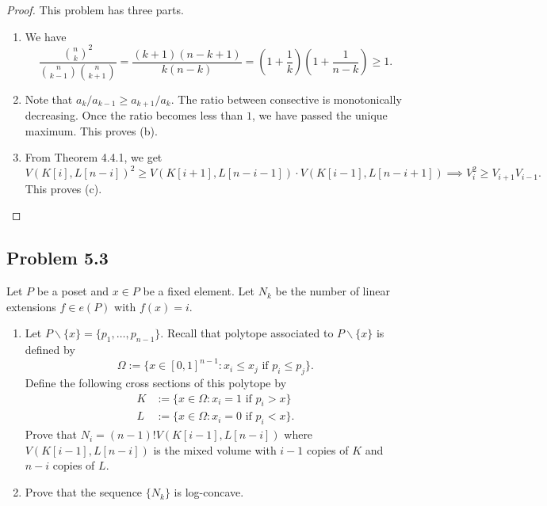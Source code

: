 \documentclass[12pt]{article}
\begin{document}
\begin{proof}
	This problem has three parts. 
	\begin{enumerate}[label = (\alph*)]
		\item We have 
		\[
			\frac{\binom{n}{k}^2}{\binom{n}{k-1} \binom{n}{k+1}} = \frac{(k+1)(n-k+1)}{k(n-k)} = \left ( 1 + \frac{1}{k} \right ) \left ( 1 + \frac{1}{n-k} \right ) \geq 1. 
		\]

		\item Note that $a_k / a_{k-1} \geq a_{k+1} / a_k$. The ratio between consective is monotonically decreasing. Once the ratio becomes less than $1$, we have passed the unique maximum. This proves (b). 

		\item From Theorem 4.4.1, we get 
		\[
			V(K[i], L[n-i])^2 \geq V(K[i+1], L[n-i-1]) \cdot V(K[i-1], L[n-i+1]) \implies V_i^2 \geq V_{i+1} V_{i-1}.
		\]
		This proves (c). 
	\end{enumerate}
\end{proof}

\newpage 

\subsection{Problem 5.3}

\begin{problem}
	Let $P$ be a poset and $x \in P$ be a fixed element. Let $N_k$ be the number of linear extensions $f \in e(P)$ with $f(x) = i$. 
    \begin{enumerate}[label = (\alph*)]
        \item Let $P \backslash \{x\} = \{p_1, \ldots, p_{n-1}\}$. Recall that polytope associated to $P \backslash \{x\}$ is defined by 
        \[
            \Omega := \{ x \in [0, 1]^{n-1} : x_i \leq x_j \text{ if } p_i \leq p_j \}.    
        \]
        Define the following cross sections of this polytope by 
        \begin{align*}
            K & := \{ x \in \Omega : x_i = 1 \text{ if } p_i > x \} \\
            L & := \{x \in \Omega : x_i = 0 \text{ if } p_i < x \}.
        \end{align*}
        Prove that $N_i = (n-1)! V(K[i-1], L[n-i])$ where $V(K[i-1], L[n-i])$ is the mixed volume with $i-1$ copies of $K$ and $n-i$ copies of $L$. 

        \item Prove that the sequence $\{N_k\}$ is log-concave.
    \end{enumerate}
\end{problem}
\end{document}
